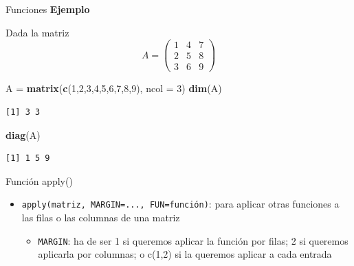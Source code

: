 \documentclass[
  ignorenonframetext,
]{beamer}
\newenvironment{Shaded}{\begin{snugshade}}{\end{snugshade}}
\newcommand{\AttributeTok}[1]{\textcolor[rgb]{0.13,0.29,0.53}{#1}}
\newcommand{\DecValTok}[1]{\textcolor[rgb]{0.00,0.00,0.81}{#1}}
\newcommand{\FunctionTok}[1]{\textcolor[rgb]{0.13,0.29,0.53}{\textbf{#1}}}
\newcommand{\NormalTok}[1]{#1}
\newcommand{\OtherTok}[1]{\textcolor[rgb]{0.56,0.35,0.01}{#1}}
\providecommand{\tightlist}{%
  \setlength{\itemsep}{0pt}\setlength{\parskip}{0pt}}
\begin{document}
\begin{frame}[fragile]{Funciones}
\label{funciones-6}
\textbf{Ejemplo}

Dada la matriz \[A = \begin{pmatrix}
1 & 4 & 7\\
2 & 5 & 8\\
3 & 6 & 9
\end{pmatrix}\]

\begin{Shaded}
\begin{Highlighting}[]
\NormalTok{A }\OtherTok{=} \FunctionTok{matrix}\NormalTok{(}\FunctionTok{c}\NormalTok{(}\DecValTok{1}\NormalTok{,}\DecValTok{2}\NormalTok{,}\DecValTok{3}\NormalTok{,}\DecValTok{4}\NormalTok{,}\DecValTok{5}\NormalTok{,}\DecValTok{6}\NormalTok{,}\DecValTok{7}\NormalTok{,}\DecValTok{8}\NormalTok{,}\DecValTok{9}\NormalTok{), }\AttributeTok{ncol =} \DecValTok{3}\NormalTok{)}
\FunctionTok{dim}\NormalTok{(A)}
\end{Highlighting}
\end{Shaded}

\begin{verbatim}
[1] 3 3
\end{verbatim}

\begin{Shaded}
\begin{Highlighting}[]
\FunctionTok{diag}\NormalTok{(A)}
\end{Highlighting}
\end{Shaded}

\begin{verbatim}
[1] 1 5 9
\end{verbatim}
\end{frame}

\begin{frame}[fragile]{Función apply()}
\label{funciuxf3n-apply}
\begin{itemize}
\tightlist
\item
  \texttt{apply(matriz,\ MARGIN=...,\ FUN=función)}: para aplicar otras
  funciones a las filas o las columnas de una matriz

  \begin{itemize}
  \tightlist
  \item
    \texttt{MARGIN}: ha de ser 1 si queremos aplicar la función por
    filas; 2 si queremos aplicarla por columnas; o c(1,2) si la queremos
    aplicar a cada entrada
  \end{itemize}
\end{itemize}
\end{frame}
\end{document}
